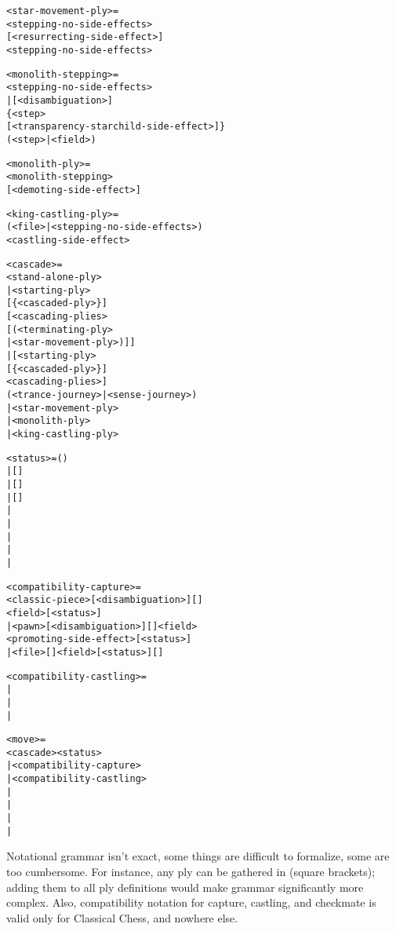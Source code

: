 \begin{alltt}
<star-movement-ply> =
  <stepping-no-side-effects>
    [<resurrecting-side-effect>]
    \alg{~}<stepping-no-side-effects>

<monolith-stepping> =
  <stepping-no-side-effects>
| [<disambiguation>]
  \{<step>
    [<transparency-starchild-side-effect>]\}
  (<step> | \alg{-}<field>)

<monolith-ply> =
  <monolith-stepping>
  [<demoting-side-effect>]

<king-castling-ply> =
  (<file> | <stepping-no-side-effects>)
  <castling-side-effect>

<cascade> =
  <stand-alone-ply>
| <starting-ply>
  [\{<cascading-plies>\alg{~}<cascaded-ply>\}]
  [<cascading-plies>
    [\alg{~}(<terminating-ply>
      | <star-movement-ply>)]]
| [<starting-ply>
    [\{<cascading-plies>\alg{~}<cascaded-ply>\}]
    <cascading-plies>\alg{~}]
  (<trance-journey> | <sense-journey>)
| <star-movement-ply>
| <monolith-ply>
| <king-castling-ply>
\end{alltt}

\clearpage %

\begin{alltt}
<status> = ()
         | [\alg{+}]
         | [\alg{+}]\alg{(=)}
         | [\alg{+}]\alg{()}
         | \alg{#}
         | \algcty{++}
         | \alg{(=)}
         | \alg{()}
         | \alg{(===)}

<compatibility-capture> =
  <classic-piece>[<disambiguation>][]
    <field>[<status>]
| <pawn>[<disambiguation>][]<field>
    <promoting-side-effect>[<status>]
| <file>[]<field>[<status>][]

<compatibility-castling> =
| 
| 
| 

<move> =
  <cascade><status>
| <compatibility-capture>
| <compatibility-castling>
| \alg{#}
| \alg{##}
| \alg{(==)}
| \alg{(===)}
\end{alltt}

\clearpage %

Notational grammar isn't exact, some things are difficult to formalize, some
are too cumbersome. For instance, any ply can be gathered in \alg{[ ]} (square
brackets); adding them to all ply definitions would make grammar significantly
more complex. Also, compatibility notation for capture, castling, and checkmate
is valid only for Classical Chess, and nowhere else.

